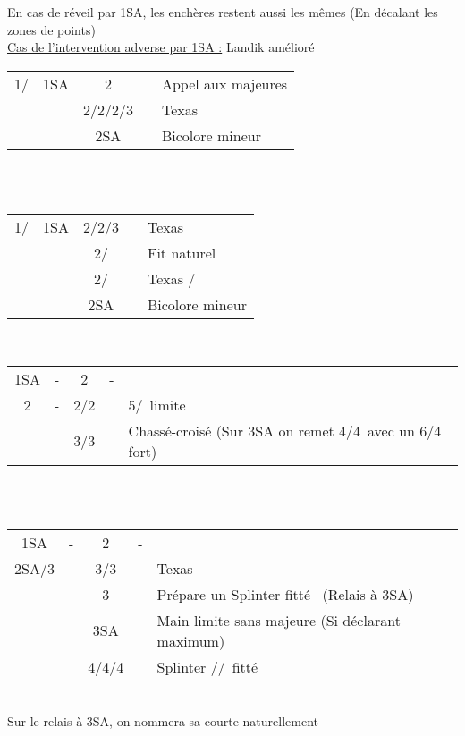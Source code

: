 \documentclass[a4paper, oneside, 11pt]{report}
\begin{document}
	En cas de réveil par 1SA, les enchères restent aussi les mêmes (En décalant les zones de points)\\
	
	\underline{Cas de l'intervention adverse par 1SA :} Landik amélioré
	
	\begin{tabular}{cccc|l}
	1\trefle/\carreau & 1SA & 2\trefle && Appel aux majeures \\
	&& 2\carreau/2\coeur/2\pique/3\trefle && Texas\\
	&& 2SA && Bicolore mineur\\
	\end{tabular}\\\\
	
	\begin{tabular}{cccc|l}
	1\coeur/\pique & 1SA & 2\trefle/2\carreau/3\trefle && Texas \\
	&& 2\coeur/\pique && Fit naturel\\
	&& 2\carreau/\coeur && Texas \pique/\trefle\\
	&& 2SA && Bicolore mineur\\
	\end{tabular}\\

\newpage
		\begin{tabular}{cccc|l}
		1SA & - & 2\trefle & - &\\
		2\carreau & - & 2\coeur/2\pique && 5\coeur/\pique\ limite\\
		&& 3\coeur/3\pique && Chassé-croisé (Sur 3SA on remet 4\coeur/4\pique\ avec un 6/4 fort)\\
		\end{tabular}\\\\

		\begin{tabular}{cccc|l}
		1SA & - & 2\trefle & - &\\
		2SA/3\trefle & - & 3\carreau/3\coeur && Texas\\
		&& 3\pique && Prépare un Splinter fitté \coeur\ (Relais à 3SA)\\
		&& 3SA && Main limite sans majeure (Si déclarant maximum)\\
		&& 4\trefle/4\carreau/4\coeur && Splinter \trefle/\carreau/\coeur\ fitté \pique\\
		\end{tabular}\\
		Sur le relais à 3SA, on nommera sa courte naturellement\\
\end{document}
